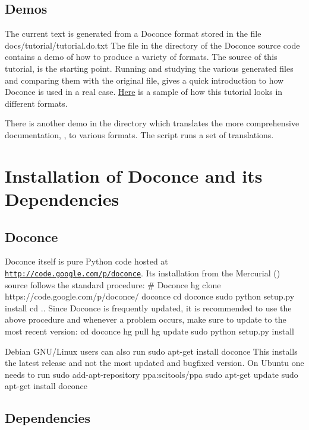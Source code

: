 \documentclass[%
oneside,                 %
final,                   %
chapterprefix=true,      %
open=right               %
10pt]{book}
\begin{document}
\subsection{Demos}

The current text is generated from a Doconce format stored in the file
\bccq
docs/tutorial/tutorial.do.txt
\eccq
The file  in the  directory of the
Doconce source code contains a demo of how to produce a variety of
formats.  The source of this tutorial,  is the
starting point.  Running  and studying the various generated
files and comparing them with the original  file,
gives a quick introduction to how Doconce is used in a real case.
\href{{https://doconce.googlecode.com/hg/doc/demos/tutorial/index.html}}{Here}
is a sample of how this tutorial looks in different formats.

There is another demo in the  directory which
translates the more comprehensive documentation, , to
various formats. The  script runs a set of translations.


\section{Installation of Doconce and its Dependencies}

\subsection{Doconce}

Doconce itself is pure Python code hosted at \href{{http://code.google.com/p/doconce}}{\nolinkurl{http://code.google.com/p/doconce}}.  Its installation from the
Mercurial () source follows the standard procedure:
\bsys
# Doconce
hg clone https://code.google.com/p/doconce/ doconce
cd doconce
sudo python setup.py install
cd ..
\esys
Since Doconce is frequently updated, it is recommended to use the
above procedure and whenever a problem occurs, make sure to
update to the most recent version:
\bsys
cd doconce
hg pull
hg update
sudo python setup.py install
\esys

Debian GNU/Linux users can also run
\bsys
sudo apt-get install doconce
\esys
This installs the latest release and not the most updated and bugfixed
version.
On Ubuntu one needs to run
\bsys
sudo add-apt-repository ppa:scitools/ppa
sudo apt-get update
sudo apt-get install doconce
\esys

\subsection{Dependencies}
\end{document}
